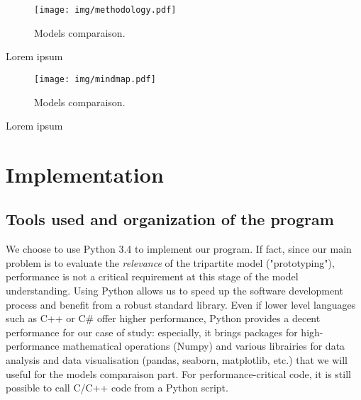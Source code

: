 \documentclass[table]{report}
\begin{document}
\begin{figure}[h]%
\centering
\texttt{[image: img/methodology.pdf]}
\caption{Models comparaison.}
\label{fig:methodology}
\end{figure}
\FloatBarrier



Lorem ipsum

\begin{figure}[h]%
\centering
\texttt{[image: img/mindmap.pdf]}
\caption{Models comparaison.}
\label{fig:mindmap}
\end{figure}
\FloatBarrier

Lorem ipsum



%
%
%
%
%






\chapter{Implementation}
\minitoc
\section{Tools used and organization of the program}

We choose to use Python 3.4 to implement our program. If fact, since our main problem is to evaluate the \textit{relevance} of the tripartite model ("prototyping"), performance is not a critical requirement at this stage of the model understanding. Using Python allows us to speed up the software development process and benefit from a robust standard library. Even if lower level languages such as C++ or C\# offer higher performance, Python provides a decent performance for our case of study: especially, it brings packages for high-performance mathematical operations (Numpy) and various librairies for data analysis and data visualisation (pandas, seaborn, matplotlib, etc.) that we will useful for the models comparaison part. For performance-critical code, it is still possible to call C/C++ code from a Python script. \\
\end{document}
